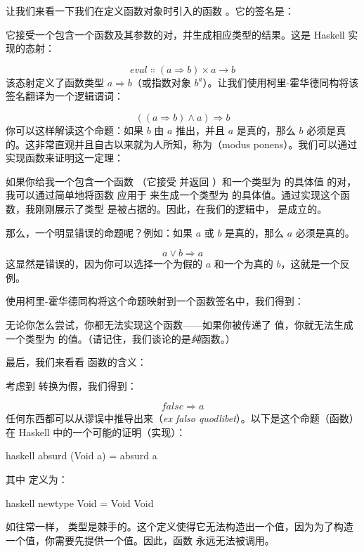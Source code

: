 让我们来看一下我们在定义函数对象时引入的函数 。它的签名是：

它接受一个包含一个函数及其参数的对，并生成相应类型的结果。这是 Haskell 实现的态射：

\[\mathit{eval} \Colon (a \Rightarrow b) \times a \to b\]
该态射定义了函数类型 $a \Rightarrow b$（或指数对象 $b^{a}$）。让我们使用柯里-霍华德同构将该签名翻译为一个逻辑谓词：

\[((a \Rightarrow b) \wedge a) \Rightarrow b\]
你可以这样解读这个命题：如果 $b$ 由 $a$ 推出，并且 $a$ 是真的，那么 $b$ 必须是真的。这非常直观并且自古以来就为人所知，称为（modus ponens）。我们可以通过实现函数来证明这一定理：

如果你给我一个包含一个函数 （它接受  并返回 ）和一个类型为  的具体值  的对，我可以通过简单地将函数  应用于  来生成一个类型为  的具体值。通过实现这个函数，我刚刚展示了类型  是被占据的。因此，在我们的逻辑中， 是成立的。

那么，一个明显错误的命题呢？例如：如果 $a$ 或 $b$ 是真的，那么 $a$ 必须是真的。

\[a \vee b \Rightarrow a\]
这显然是错误的，因为你可以选择一个为假的 $a$ 和一个为真的 $b$，这就是一个反例。

使用柯里-霍华德同构将这个命题映射到一个函数签名中，我们得到：

无论你怎么尝试，你都无法实现这个函数——如果你被传递了  值，你就无法生成一个类型为  的值。（请记住，我们谈论的是\emph{纯}函数。）

最后，我们来看看  函数的含义：

考虑到  转换为假，我们得到：

\[\mathit{false} \Rightarrow a\]
任何东西都可以从谬误中推导出来（\emph{ex falso quodlibet}）。以下是这个命题（函数）在 Haskell 中的一个可能的证明（实现）：

\begin{snip}{haskell}
  absurd (Void a) = absurd a
\end{snip}
其中  定义为：

\begin{snip}{haskell}
  newtype Void = Void Void
\end{snip}
如往常一样， 类型是棘手的。这个定义使得它无法构造出一个值，因为为了构造一个值，你需要先提供一个值。因此，函数  永远无法被调用。

